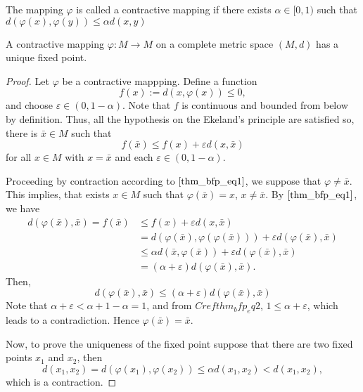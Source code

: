     \noindent The mapping $\varphi$ is called a contractive mapping if there
    exists $\alpha \in [0,1)$ such that $d(\varphi(x), \varphi(y)) \leq %
    \alpha d(x,y)$

    \begin{theorem} \label{thm: BFP} %
        A contractive mapping $\varphi : M \to M$ on a complete metric space $(M,d)$
        has a unique fixed point.
    \end{theorem}
    \begin{proof}
        Let $\varphi$ be a contractive mappping. Define a function 
        $$
            f(x):= d(x, \varphi(x))\leq 0,
        $$
        and choose $\varepsilon\in (0, 1-\alpha)$. Note that $f$ is continuous and
        bounded from below by definition. Thus, all the hypothesis on the Ekeland's
        principle are satisfied so, there is $\bar{x}\in M$ such that
        \begin{equation}\label{thm_bfp_eq1}
            f(\bar{x})\leq f(x)+\varepsilon d(x, \bar{x})
        \end{equation}
        for all $x\in M$ with $x=\bar{x}$ and each $\varepsilon\in (0, 1-\alpha)$.
        
        Proceeding by contraction according to $\eqref{thm_bfp_eq1}$, we suppose that
        $\varphi\neq\bar{x}$. This implies, that exists $x\in M$ such that
        $\varphi(\bar{x})=x$, $x\neq\bar{x}$. By $\eqref{thm_bfp_eq1}$, we have
        \begin{align*}
            d(\varphi(\bar{x}), \bar{x}) = f(\bar{x}) 
                &\leq
                    f(x)+ \varepsilon d(x, \bar{x}) \\
                &= 
                    d(\varphi(\bar{x}), \varphi(\varphi(\bar{x})))+\varepsilon 
                    d(\varphi(\bar{x}),\bar{x}) \\
                &\leq 
                    \alpha d(\bar{x}, \varphi(\bar{x})) + \varepsilon 
                    d(\varphi(\bar{x}), \bar{x}) \\
                &=
                    (\alpha +\varepsilon) d(\varphi(\bar{x}),\bar{x}).
        \end{align*}
        Then, 
        \begin{equation}\label{thm_bfp_eq2}
            d(\varphi(\bar{x}), \bar{x})\leq (\alpha+\varepsilon) %
            d(\varphi(\bar{x}),\bar{x})
        \end{equation}
        Note that $\alpha+\varepsilon<\alpha +1-\alpha=1$, and from
        $Cref{thm_bfp_eq2}$, $1\leq \alpha+\varepsilon$, which leads to a
        contradiction. Hence  $\varphi(\bar{x})=\bar{x}$. 
        
        Now, to prove the uniqueness of the fixed point suppose that there
        are two fixed points $x_{1}$ and $x_{2}$, then
        $$
            d(x_{1}, x_{2})=d(\varphi(x_{1}), \varphi(x_{2}))\leq \alpha %
            d(x_{1}, x_{2})< d(x_{1}, x_{2}),
        $$
        which is a contraction.
    \end{proof}
